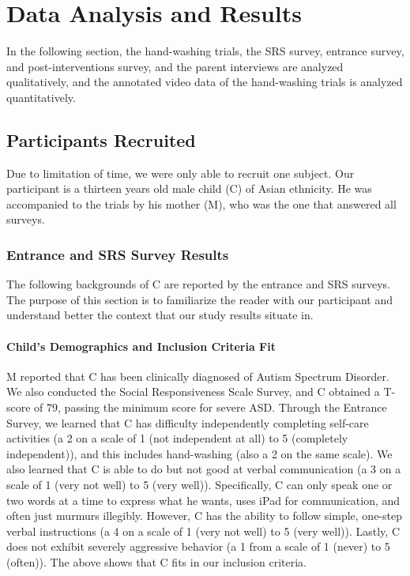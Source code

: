 \section{Data Analysis and Results}
In the following section, the hand-washing trials, the SRS survey, entrance survey, and post-interventions survey, and the parent interviews are analyzed qualitatively, and the annotated video data of the hand-washing trials is analyzed quantitatively.  

\subsection{Participants Recruited}
Due to limitation of time, we were only able to recruit one subject.  Our participant is a thirteen years old male child (C) of Asian ethnicity.  He was accompanied to the trials by his mother (M), who was the one that answered all surveys.

\subsubsection{Entrance and SRS Survey Results}
The following backgrounds of C are reported by the entrance and SRS surveys.  The purpose of this section is to familiarize the reader with our participant and understand better the context that our study results situate in.

\paragraph{Child's Demographics and Inclusion Criteria Fit}
M reported that C has been clinically diagnosed of Autism Spectrum Disorder.  We also conducted the Social Responsiveness Scale Survey, and C obtained a T-score of 79, passing the minimum score for severe ASD.  Through the Entrance Survey, we learned that C has difficulty independently completing self-care activities (a 2 on a scale of 1 (not independent at all) to 5 (completely independent)), and this includes hand-washing (also a 2 on the same scale).  We also learned that C is able to do but not good at verbal communication (a 3 on a scale of 1 (very not well) to 5 (very well)).  Specifically, C can only speak one or two words at a time to express what he wants, uses iPad for communication, and often just murmurs illegibly.  However, C has the ability to follow simple, one-step verbal instructions (a 4 on a scale of 1 (very not well) to 5 (very well)).  Lastly, C does not exhibit severely aggressive behavior (a 1 from a scale of 1 (never) to 5 (often)).  The above shows that C fits in our inclusion criteria.

